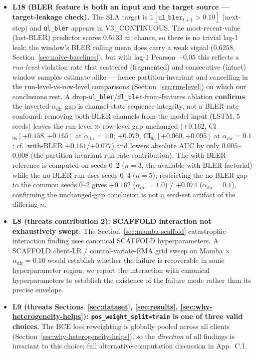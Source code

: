 \documentclass[journal]{IEEEtran}
\newcommand{\alphadir}{\ensuremath{\alpha_{\mathrm{dir}}}}
\begin{document}
\begin{itemize}
  \item \textbf{L18 (BLER feature is both an input and the target source --- target-leakage check).} The SLA target is $\mathbb{1}[\mathtt{ul\_bler}_{t+1} > 0.10]$ (next-step) and \lstinline|ul_bler| appears in V3\_CONTINUOUS. The most-recent-value (last-BLER) predictor scores $0.5133 \approx$ chance, so there is no trivial lag-1 leak; the window's BLER rolling mean does carry a weak signal ($0.6258$, Section~\ref{sec:naive-baselines}), but with lag-1 Pearson $-0.05$ this reflects a \emph{run-level} violation rate that scattered (fragmented) and consecutive (intact) window samples estimate alike --- hence partition-invariant and cancelling in the run-level-vs-row-level comparisons (Section~\ref{sec:run-level}) on which our conclusions rest. A drop-\lstinline|ul_bler|/\lstinline|dl_bler|-from-features ablation \textbf{confirms} the inverted-$\alphadir$ gap is channel-state sequence-integrity, not a BLER-rate confound: removing both BLER channels from the model input (LSTM, 5 seeds) leaves the run-level$\gg$row-level gap unchanged ($+0.162$, CI$_{95}[+0.158,+0.165]$ at $\alphadir{=}1.0$; $+0.079$, CI$_{95}[+0.060,+0.095]$ at $\alphadir{=}0.1$; cf.\ with-BLER $+0.161$/$+0.077$) and lowers absolute AUC by only $0.005$--$0.008$ (the partition-invariant run-rate contribution). The with-BLER reference is computed on seeds 0--2 ($n{=}3$, the available with-BLER factorial) while the no-BLER run uses seeds 0--4 ($n{=}5$); restricting the no-BLER gap to the common seeds 0--2 gives $+0.162$ ($\alphadir{=}1.0$) / $+0.074$ ($\alphadir{=}0.1$), confirming the unchanged-gap conclusion is not a seed-set artifact of the differing $n$.

  \item \textbf{L8 (threats contribution 2): SCAFFOLD interaction not exhaustively swept.} The Section~\ref{sec:mamba-scaffold} catastrophic-interaction finding uses canonical SCAFFOLD hyperparameters. A SCAFFOLD client-LR / control-variate-EMA grid sweep on Mamba $\times$ $\alphadir = 0.10$ would establish whether the failure is recoverable in some hyperparameter region; we report the interaction with canonical hyperparameters to establish the existence of the failure mode rather than its precise envelope.

  \item \textbf{L9 (threats Sections~\ref{sec:dataset}, \ref{sec:results}, \ref{sec:why-heterogeneity-helps}): \lstinline|pos_weight_split=train| is one of three valid choices.} The BCE loss reweighting is globally pooled across all clients (Section~\ref{sec:why-heterogeneity-helps}), so the \emph{direction} of all findings is invariant to this choice; full alternative-computation discussion in App.~C.1.


\end{itemize}
\end{document}
